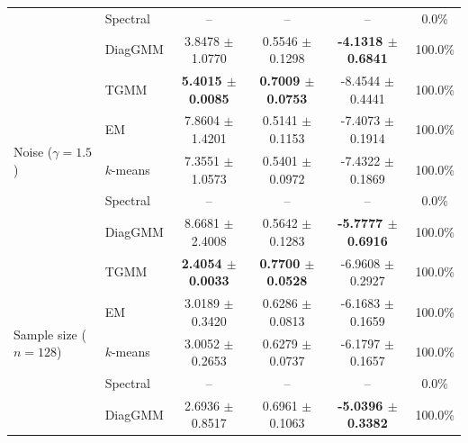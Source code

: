 \documentclass{article}
\begin{document}
\begin{table}[t]
{\begin{tabular}{llcccc}
& Spectral & -- & -- & -- & 0.0\% \\
& DiagGMM & 3.8478 $\pm$ 1.0770 & 0.5546 $\pm$ 0.1298 & \textbf{-4.1318 $\pm$ 0.6841} & 100.0\% \\
\midrule
\multirow{5}{*}{Noise ($\gamma=1.5$)}
& TGMM & \textbf{5.4015 $\pm$ 0.0085} & \textbf{0.7009 $\pm$ 0.0753} & -8.4544 $\pm$ 0.4441 & 100.0\% \\
& EM & 7.8604 $\pm$ 1.4201 & 0.5141 $\pm$ 0.1153 & -7.4073 $\pm$ 0.1914 & 100.0\% \\
& $k$-means & 7.3551 $\pm$ 1.0573 & 0.5401 $\pm$ 0.0972 & -7.4322 $\pm$ 0.1869 & 100.0\% \\
& Spectral & -- & -- & -- & 0.0\% \\
& DiagGMM & 8.6681 $\pm$ 2.4008 & 0.5642 $\pm$ 0.1283 & \textbf{-5.7777 $\pm$ 0.6916} & 100.0\% \\
\midrule
\multirow{5}{*}{Sample size ($n=128$)}
& TGMM & \textbf{2.4054 $\pm$ 0.0033} & \textbf{0.7700 $\pm$ 0.0528} & -6.9608 $\pm$ 0.2927 & 100.0\% \\
& EM & 3.0189 $\pm$ 0.3420 & 0.6286 $\pm$ 0.0813 & -6.1683 $\pm$ 0.1659 & 100.0\% \\
& $k$-means & 3.0052 $\pm$ 0.2653 & 0.6279 $\pm$ 0.0737 & -6.1797 $\pm$ 0.1657 & 100.0\% \\
& Spectral & -- & -- & -- & 0.0\% \\
& DiagGMM & 2.6936 $\pm$ 0.8517 & 0.6961 $\pm$ 0.1063 & \textbf{-5.0396 $\pm$ 0.3382} & 100.0\% \\
\bottomrule
\end{tabular}%
}
\end{table}
\end{document}
